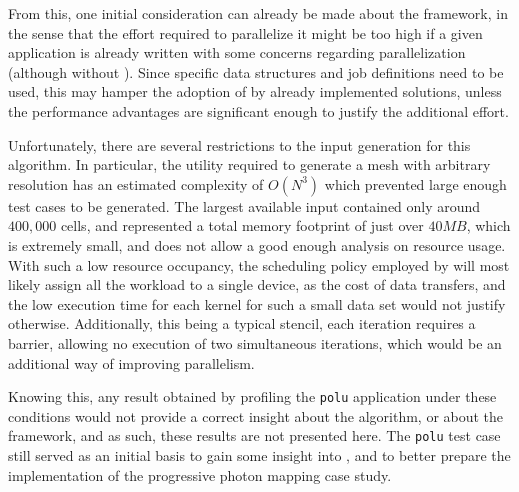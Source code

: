 \documentclass[main.tex]{subfiles}
\begin{document}
From this, one initial consideration can already be made about the framework, in the sense that the effort required to parallelize it might be too high if a given application is already written with some concerns regarding parallelization (although without \gama). Since specific data structures and job definitions need to be used, this may hamper the adoption of \gama by already implemented solutions, unless the performance advantages are significant enough to justify the additional effort.



Unfortunately, there are several restrictions to the input generation for this algorithm. In particular, the utility required to generate a mesh with arbitrary resolution has an estimated complexity of $O(N^3)$ which prevented large enough test cases to be generated. The largest available input contained only around $400,000$ cells, and represented a total memory footprint of just over $40MB$, which is extremely small, and does not allow a good enough analysis on resource usage. With such a low resource occupancy, the scheduling policy employed by \gama will most likely assign all the workload to a single device, as the cost of data transfers, and the low execution time for each kernel for such a small data set would not justify otherwise. Additionally, this being a typical stencil, each iteration requires a barrier, allowing no execution of two simultaneous iterations, which would be an additional way of improving parallelism.

Knowing this, any result obtained by profiling the \texttt{polu} application under these conditions would not provide a correct insight about the algorithm, or about the framework, and as such, these results are not presented here.
The \texttt{polu} test case still served as an initial basis to gain some insight into \gama, and to better prepare the implementation of the progressive photon mapping case study.
\end{document}
